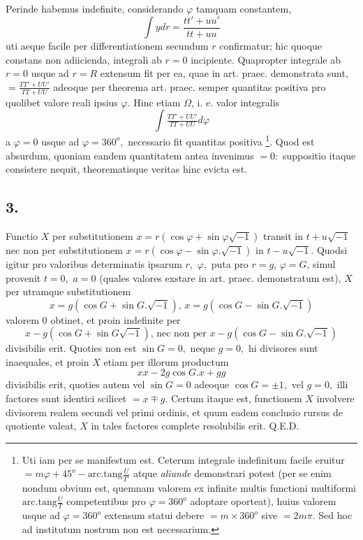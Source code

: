 \documentclass[14pt]{memoir}
\theoremstyle{plain}
\theoremstyle{remark}
\begin{document}
Perinde habemus indefinite, considerando \(\varphi\) tamquam constantem, 
\[\displaystyle \int ydr = \frac{tt'+uu'}{tt+uu}\]
uti aeque facile per differentiationem secundum \(r\) confirmatur; hic quoque constans non adiicienda, integrali ab \(r=0\) incipiente. Quapropter integrale ab \(r=0\) usque ad \(r=R\) extensum fit per ea, quae in art. praec. demonstrata sunt, \(=\frac{TT'+UU'}{TT+UU}\) adeoque per theorema art. praec. semper quantitas positiva pro quolibet valore reali ipsius \(\varphi\). Hinc etiam \(\Omega\), i. e. valor integralis \[\displaystyle \int\tfrac{TT'+UU'}{TT+UU}d\varphi \] a \(\varphi =0\) usque ad \(\varphi = 360^o,\) necessario fit quantitas positiva \footnote{Uti iam per se manifestum est. Ceterum integrale indefinitum facile eruitur \(= m\varphi+45^o-\mathrm{arc.tang}\tfrac{U}{T'}\) atque \textit{aliunde} demonstrari potest (per se enim nondum obvium est, quemnam valorem ex infinite multis functioni multiformi \(\mathrm{arc.tang}\tfrac{U}{T}\) competentibus pro \(\varphi = 360^o\) adoptare oporteat), huius valorem usque ad \(\varphi = 360^o\) extensum statui debere \(=m\times360^o\) sive \(=2 m\pi\). Sed hoc ad institutum nostrum non est necessarium.}. Quod est absurdum, quoniam eandem quantitatem antea invenimus \(=0:\) suppositio itaque consistere nequit, theorematisque veritas hinc evicta est. 

\subsection*{3.} 

Functio \(X\) per substitutionem \(x = r(\cos\varphi + \sin\varphi \surd{-1})\) transit in \(t+u\surd{-1}\) nec non per substitutionem \(x=r(\cos\varphi-\sin\varphi.\surd{-1})\) in \(t-u\surd{-1}.\) Quodsi igitur pro valoribus determinatis ipsarum \(r,\) \(\varphi,\) puta pro \(r=g\), \(\varphi=G\), simul provenit \(t=0,\) \(a=0\) (quales valores exstare in art. praec. demonstratum est), \(X\) per utramque substitutionem \[ x=g(\cos G+\sin G.\surd{-1})\text{, }x=g(\cos G - \sin G.\surd{-1})\]
valorem 0 obtinet, et proin indefinite per 
\[ x-g(\cos G+\sin G\surd{-1})\text{, nec non per }x-g(\cos G - \sin G.\surd{-1})\]
divisibilis erit. Quoties non est \(\sin G=0,\) neque \(g=0,\) hi divisores sunt 
inaequales, et proin \(X\) etiam per illorum productum 
\[xx-2g\cos G .x+gg\]
divisibilis erit, quoties autem vel \(\sin G =0\) adeoque \(\cos G=\pm1,\) vel \(g=0,\) illi factores sunt identici scilicet \(=x\mp g\). Certum itaque est, functionem \(X\) involvere divisorem realem secundi vel primi ordinis, et quum eadem conclusio rursus de quotiente valeat, \(X\) in tales factores complete resolubilis erit. Q.E.D. 
\end{document}
